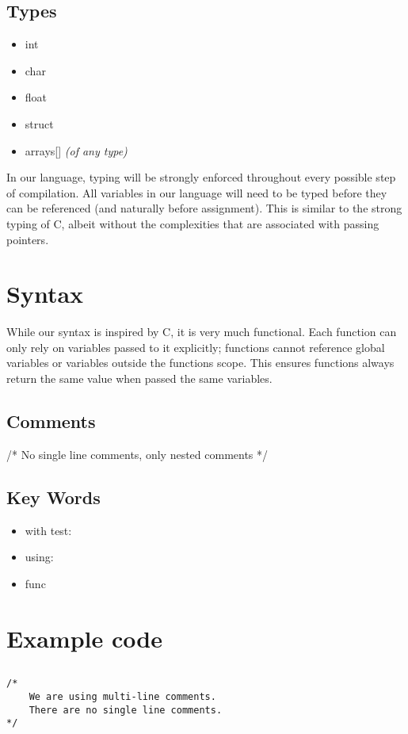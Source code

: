 \documentclass{article}
\begin{document}
\subsection{Types}
\begin{itemize}
	\item int
	\item char
	\item float
	\item struct
	\item arrays[] \textit{(of any type)}
\end{itemize}

In our language, typing will be strongly enforced throughout every possible step of compilation. All variables in our language will need to be typed before they can be referenced (and naturally before assignment). This is similar to the strong typing of C, albeit without the complexities that are associated with passing pointers.
\section{Syntax}
While our syntax is inspired by C, it is very much functional. Each function can only rely on variables passed to it explicitly; functions cannot reference global variables or variables outside the functions scope. This ensures functions always return the same value when passed the same variables.

\subsection{Comments}

/* No single line comments, only nested comments */

\subsection{Key Words}
\begin{itemize}
	\item
	with test: 
	\item
	using:
	\item 
	func
\end{itemize}

	
\section{Example code}
\subsection{}
\begin{lstlisting}
/*
	We are using multi-line comments.
	There are no single line comments.
*/
\end{lstlisting}
\end{document}
